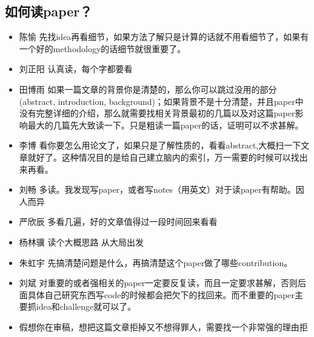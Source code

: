 \documentclass{vivid_layout}
\begin{document}
\subsection{如何读paper？}
\begin{itemize}
\item  { 陈愉}  \quad  先找idea再看细节，如果方法了解只是计算的话就不用看细节了，如果有一个好的methodology的话细节就很重要了。
\item  { 刘正阳}  \quad 认真读，每个字都要看
\item  { 田博雨}  \quad 如果一篇文章的背景你是清楚的，那么你可以跳过没用的部分(abstract, introduction, background)；如果背景不是十分清楚，并且paper中没有完整详细的介绍，那么就需要找相关背景最初的几篇以及对这篇paper影响最大的几篇先大致读一下。只是粗读一篇paper的话，证明可以不求甚解。
\item  { 李博}  \quad 看你要怎么用论文了，如果只是了解性质的，看看abstract,大概扫一下文章就好了。这种情况目的是给自己建立脑内的索引，万一需要的时候可以找出来再看。
\item  { 刘畅}  \quad 多读。我发现写paper，或者写notes（用英文）对于读paper有帮助。因人而异
\item  { 严欣辰}  \quad 多看几遍，好的文章值得过一段时间回来看看
\item  { 杨林骥}  \quad 读个大概思路 从大局出发
\item  { 朱虹宇}  \quad 先搞清楚问题是什么，再搞清楚这个paper做了哪些contribution。
\item  { 刘斌}  \quad 对重要的或者强相关的paper一定要反复读，而且一定要求甚解，否则后面具体自己研究东西写code的时候都会把欠下的找回来。而不重要的paper主要抓idea和challenge就可以了。
\item 假想你在审稿，想把这篇文章拒掉又不想得罪人，需要找一个非常强的理由拒
\end{itemize}
\end{document}
